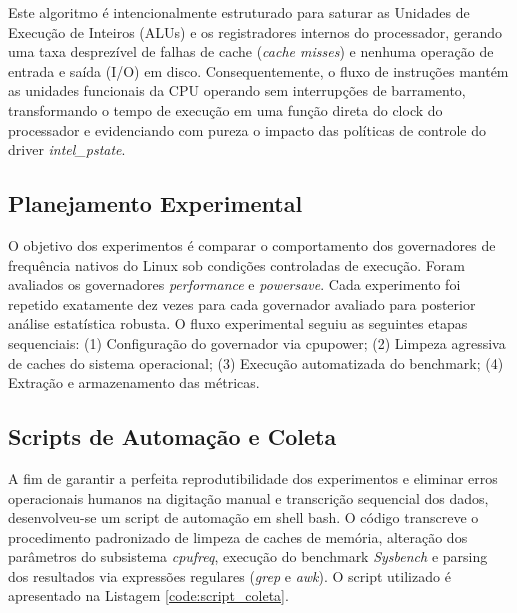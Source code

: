 \documentclass[12pt]{article}
\begin{document}
Este algoritmo é intencionalmente estruturado para saturar as Unidades de Execução de Inteiros (ALUs) e os registradores internos do processador, gerando uma taxa desprezível de falhas de cache (\textit{cache misses}) e nenhuma operação de entrada e saída (I/O) em disco. Consequentemente, o fluxo de instruções mantém as unidades funcionais da CPU operando sem interrupções de barramento, transformando o tempo de execução em uma função direta do clock do processador e evidenciando com pureza o impacto das políticas de controle do driver \textit{intel\_pstate}.

\subsection{Planejamento Experimental}

O objetivo dos experimentos é comparar o comportamento dos governadores de frequência nativos do Linux sob condições controladas de execução. Foram avaliados os governadores \textit{performance} e \textit{powersave}. Cada experimento foi repetido exatamente dez vezes para cada governador avaliado para posterior análise estatística robusta. O fluxo experimental seguiu as seguintes etapas sequenciais: (1) Configuração do governador via cpupower; (2) Limpeza agressiva de caches do sistema operacional; (3) Execução automatizada do benchmark; (4) Extração e armazenamento das métricas.

\subsection{Scripts de Automação e Coleta}

A fim de garantir a perfeita reprodutibilidade dos experimentos e eliminar erros operacionais humanos na digitação manual e transcrição sequencial dos dados, desenvolveu-se um script de automação em shell bash. O código transcreve o procedimento padronizado de limpeza de caches de memória, alteração dos parâmetros do subsistema \textit{cpufreq}, execução do benchmark \textit{Sysbench} e parsing dos resultados via expressões regulares (\textit{grep} e \textit{awk}). O script utilizado é apresentado na Listagem \ref{code:script_coleta}.
\end{document}
